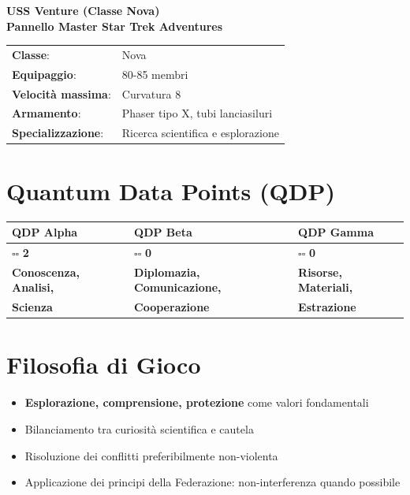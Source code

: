 \documentclass[11pt,a4paper]{article}
\begin{document}
\begin{center}
\Huge\textbf{\textcolor{fedblue}{USS Venture (Classe Nova)}}\\[0.5cm]
\Large\textbf{Pannello Master Star Trek Adventures}
\end{center}

\begin{tcolorbox}[colback=fedlightblue!20, colframe=fedblue, title=\textbf{Informazioni sulla Nave}]
\begin{tabular}{ll}
\textbf{Classe}: & Nova \\
\textbf{Equipaggio}: & 80-85 membri \\
\textbf{Velocità massima}: & Curvatura 8 \\
\textbf{Armamento}: & Phaser tipo X, tubi lanciasiluri \\
\textbf{Specializzazione}: & Ricerca scientifica e esplorazione \\
\end{tabular}
\end{tcolorbox}

\section{Quantum Data Points (QDP)}

\begin{tcolorbox}[colback=fedlightblue!10, colframe=fedblue]
\begin{tabularx}{\textwidth}{|X|X|X|}
\hline
\rowcolor{fedblue!20} \textbf{QDP Alpha} & \textbf{QDP Beta} & \textbf{QDP Gamma} \\
\hline
\large $\square\square$ \textbf{2} & \large $\square\square$ \textbf{0} & \large $\square\square$ \textbf{0} \\
\hline
\textbf{Conoscenza, Analisi,} & \textbf{Diplomazia, Comunicazione,} & \textbf{Risorse, Materiali,} \\
\textbf{Scienza} & \textbf{Cooperazione} & \textbf{Estrazione} \\
\hline
\end{tabularx}
\end{tcolorbox}

\section{Filosofia di Gioco}

\begin{tcolorbox}[colback=fedlightblue!10, colframe=fedblue]
\begin{itemize}[leftmargin=*]
\item \textbf{Esplorazione, comprensione, protezione} come valori fondamentali
\item Bilanciamento tra curiosità scientifica e cautela
\item Risoluzione dei conflitti preferibilmente non-violenta
\item Applicazione dei principi della Federazione: non-interferenza quando possibile
\end{itemize}
\end{tcolorbox}
\end{document}
